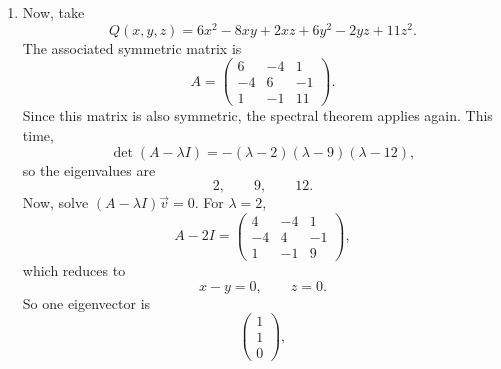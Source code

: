 \documentclass[10pt]{extarticle}
\begin{document}
\begin{enumerate}[label=(\alph*)]
\[
P^TP=I.
\]
Next, place the eigenvalues on the diagonal:
\[
\Sigma=
\begin{pmatrix}
6 & 0 & 0\\
0 & 1 & 0\\
0 & 0 & -4
\end{pmatrix}.
\]
If we multiply $A$ by $P$, column by column we get
\[
AP=
\begin{pmatrix}
A\vec{u}_1 & A\vec{u}_2 & A\vec{u}_3
\end{pmatrix}
=
\begin{pmatrix}
6\vec{u}_1 & \vec{u}_2 & -4\vec{u}_3
\end{pmatrix}.
\]
But that is exactly the same as multiplying $P$ by $D$:
\[
P\Sigma=
\begin{pmatrix}
6\vec{u}_1 & \vec{u}_2 & -4\vec{u}_3
\end{pmatrix}.
\]
So
\[
AP=P\Sigma.
\]
Now, multiply on the left by $P^T$:
\[
P^TAP=\Sigma.
\]
So the diagonalization in matrix form is
\[
\boxed{A=P\Sigma P^T.}
\]
If we also write the quadratic form in the new coordinates
\[
\begin{pmatrix}
u\\v\\w
\end{pmatrix}
=
P^T
\begin{pmatrix}
x\\y\\z
\end{pmatrix},
\]
that is,
\[
u=\frac{4x+3y+5z}{5\sqrt{2}},
\qquad
v=\frac{-3x+4y}{5},
\qquad
w=\frac{-4x-3y+5z}{5\sqrt{2}},
\]
then
\[
Q=6u^2+v^2-4w^2.
\]

\item Now, take
\[
Q(x,y,z)=6x^2-8xy+2xz+6y^2-2yz+11z^2.
\]
The associated symmetric matrix is
\[
A=
\begin{pmatrix}
6 & -4 & 1\\
-4 & 6 & -1\\
1 & -1 & 11
\end{pmatrix}.
\]
Since this matrix is also symmetric, the spectral theorem applies again. This time,
\[
\det(A-\lambda I)=-(\lambda-2)(\lambda-9)(\lambda-12),
\]
so the eigenvalues are
\[
2,\qquad 9,\qquad 12.
\]
Now, solve $(A-\lambda I)\vec{v}=0$. For $\lambda=2$,
\[
A-2I=
\begin{pmatrix}
4 & -4 & 1\\
-4 & 4 & -1\\
1 & -1 & 9
\end{pmatrix},
\]
which reduces to
\[
x-y=0,
\qquad
z=0.
\]
So one eigenvector is
\[
\begin{pmatrix}
1\\1\\0
\end{pmatrix},
\]


\end{enumerate}
\end{document}
